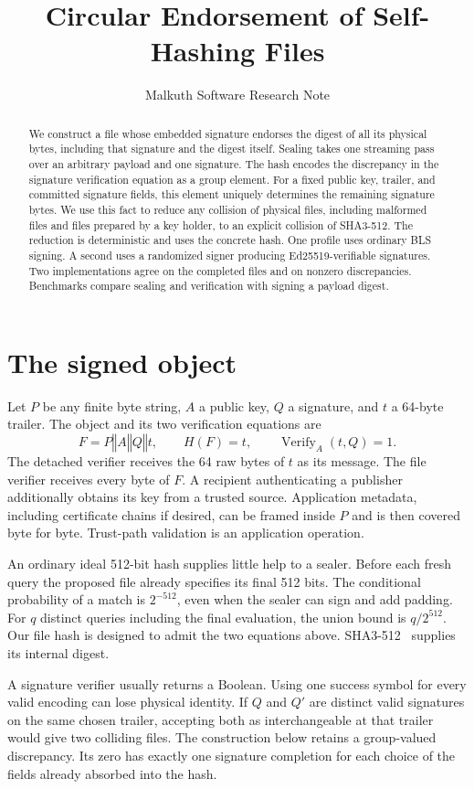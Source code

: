 \documentclass[10pt,twocolumn,letterpaper]{article}
\title{\vspace{-2em}\bfseries Circular Endorsement of Self-Hashing Files}
\author{\normalsize Malkuth Software Research Note}
\date{}
\newcommand{\cat}{\mathbin\Vert}
\newcommand{\Ver}{\operatorname{Verify}}
\begin{document}
\maketitle
\begin{abstract}
We construct a file whose embedded signature endorses the digest of all its physical bytes, including that signature and the digest itself. Sealing takes one streaming pass over an arbitrary payload and one signature. The hash encodes the discrepancy in the signature verification equation as a group element. For a fixed public key, trailer, and committed signature fields, this element uniquely determines the remaining signature bytes. We use this fact to reduce any collision of physical files, including malformed files and files prepared by a key holder, to an explicit collision of SHA3-512. The reduction is deterministic and uses the concrete hash. One profile uses ordinary BLS signing. A second uses a randomized signer producing Ed25519-verifiable signatures. Two implementations agree on the completed files and on nonzero discrepancies. Benchmarks compare sealing and verification with signing a payload digest.
\end{abstract}

\section{The signed object}
Let $P$ be any finite byte string, $A$ a public key, $Q$ a signature, and $t$ a 64-byte trailer. The object and its two verification equations are
\[
 F=P\cat A\cat Q\cat t,\qquad
 H(F)=t,\qquad \Ver_A(t,Q)=1 .
\]
The detached verifier receives the 64 raw bytes of $t$ as its message. The file verifier receives every byte of $F$. A recipient authenticating a publisher additionally obtains its key from a trusted source. Application metadata, including certificate chains if desired, can be framed inside $P$ and is then covered byte for byte. Trust-path validation is an application operation.

An ordinary ideal 512-bit hash supplies little help to a sealer. Before each fresh query the proposed file already specifies its final 512 bits. The conditional probability of a match is $2^{-512}$, even when the sealer can sign and add padding. For $q$ distinct queries including the final evaluation, the union bound is $q/2^{512}$. Our file hash is designed to admit the two equations above. SHA3-512~\cite{fips} supplies its internal digest.

A signature verifier usually returns a Boolean. Using one success symbol for every valid encoding can lose physical identity. If $Q$ and $Q'$ are distinct valid signatures on the same chosen trailer, accepting both as interchangeable at that trailer would give two colliding files. The construction below retains a group-valued discrepancy. Its zero has exactly one signature completion for each choice of the fields already absorbed into the hash.
\end{document}
